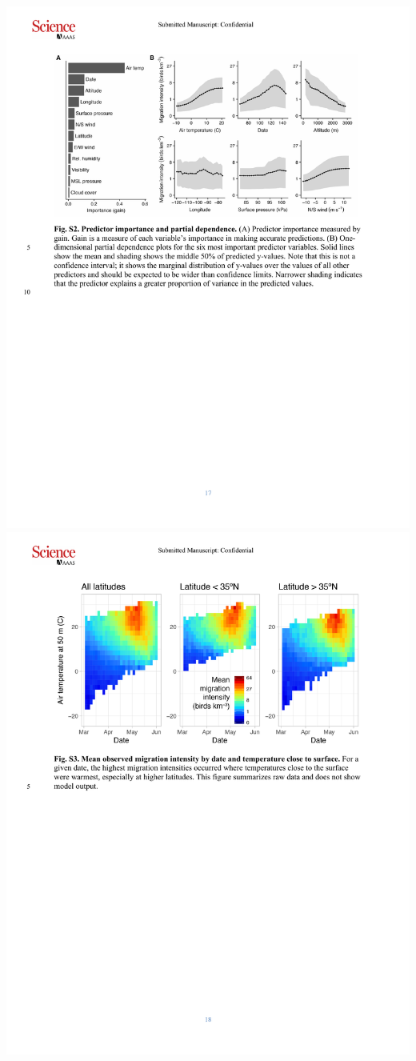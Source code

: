 \documentclass[a4paper, twoside]{templates/ociamthesis}
\begin{document}
\includegraphics[width=1\linewidth]{pdf_chapters/forecast/forecast_supp_crop_Part7}
\includegraphics[width=1\linewidth]{pdf_chapters/forecast/forecast_supp_crop_Part8}
\end{document}
